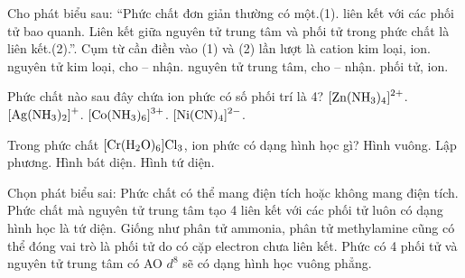 \documentclass[11pt,a4paper]{article}
\begin{document}
\begin{ex}
Cho phát biểu sau: “Phức chất đơn giản thường có một.(1). liên kết với các phối tử bao quanh. Liên kết giữa nguyên tử trung tâm và phối tử trong phức chất là liên kết.(2).”. Cụm từ cần điền vào (1) và (2) lần lượt là
\choice
{cation kim loại, ion.}
{nguyên tử kim loại, cho -- nhận.}
{\True nguyên tử trung tâm, cho -- nhận.}
{phối tử, ion.}
\end{ex}

\begin{ex}
Phức chất nào sau đây chứa ion phức có số phối trí là 4?
\choice
{\True $\ce{[Zn(NH3)4]^2+}$.}
{$\ce{[Ag(NH3)2]+}$.}
{$\ce{[Co(NH3)6]^3+}$.}
{$\ce{[Ni(CN)4]^2-}$.}
\end{ex}

\begin{ex}
Trong phức chất $\ce{[Cr(H2O)6]Cl3}$, ion phức có dạng hình học gì?
\choice
{Hình vuông.}
{Lập phương.}
{\True Hình bát diện.}
{Hình tứ diện.}
\end{ex}

\begin{ex}
Chọn phát biểu sai:
\choice
{Phức chất có thể mang điện tích hoặc không mang điện tích.}
{\True Phức chất mà nguyên tử trung tâm tạo 4 liên kết với các phối tử luôn có dạng hình học là tứ diện.}
{Giống như phân tử ammonia, phân tử methylamine cũng có thể đóng vai trò là phối tử do có cặp electron chưa liên kết.}
{Phức có 4 phối tử và nguyên tử trung tâm có AO $d^8$ sẽ có dạng hình học vuông phẳng.}
\end{ex}
\end{document}
